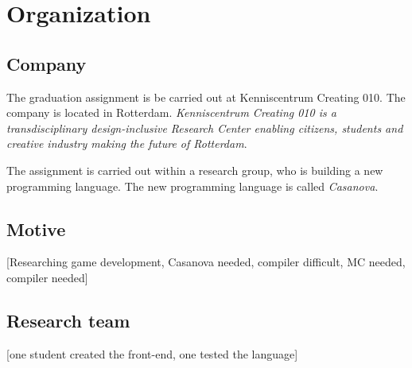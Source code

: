 \section{Organization}
\subsection{Company}
The graduation assignment is be carried out at Kenniscentrum Creating 010.
The company is located in Rotterdam.
\textit{Kenniscentrum Creating 010 is a transdisciplinary design-inclusive Research Center enabling citizens, students and creative industry making the future of Rotterdam}\cite{creating2016home}.

The assignment is carried out within a research group, who is building a new programming language.
The new programming language is called \emph{Casanova}.

\subsection{Motive}\label{motive}
[Researching game development, Casanova needed, compiler difficult, MC needed, compiler needed]


\subsection{Research team}
[one student created the front-end, one tested the language]

